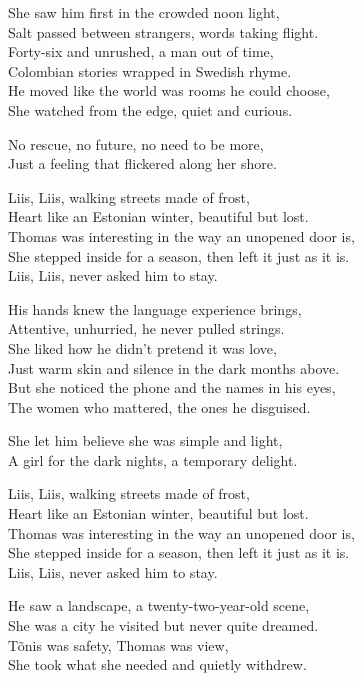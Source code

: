 \begin{lyrics}
She saw him first in the crowded noon light,\\
Salt passed between strangers, words taking flight.\\
Forty-six and unrushed, a man out of time,\\
Colombian stories wrapped in Swedish rhyme.\\
He moved like the world was rooms he could choose,\\
She watched from the edge, quiet and curious.

No rescue, no future, no need to be more,\\
Just a feeling that flickered along her shore.

Liis, Liis, walking streets made of frost,\\
Heart like an Estonian winter, beautiful but lost.\\
Thomas was interesting in the way an unopened door is,\\
She stepped inside for a season, then left it just as it is.\\
Liis, Liis, never asked him to stay.

His hands knew the language experience brings,\\
Attentive, unhurried, he never pulled strings.\\
She liked how he didn’t pretend it was love,\\
Just warm skin and silence in the dark months above.\\
But she noticed the phone and the names in his eyes,\\
The women who mattered, the ones he disguised.

She let him believe she was simple and light,\\
A girl for the dark nights, a temporary delight.

Liis, Liis, walking streets made of frost,\\
Heart like an Estonian winter, beautiful but lost.\\
Thomas was interesting in the way an unopened door is,\\
She stepped inside for a season, then left it just as it is.\\
Liis, Liis, never asked him to stay.

He saw a landscape, a twenty-two-year-old scene,\\
She was a city he visited but never quite dreamed.\\
Tõnis was safety, Thomas was view,\\
She took what she needed and quietly withdrew.


\end{lyrics}
